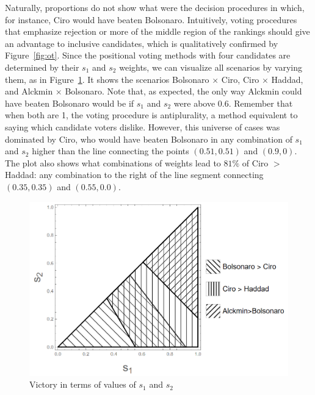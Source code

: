 \documentclass[hidelinks,11pt]{article} \usepackage[utf8]{inputenc}
\begin{document}


Naturally, proportions do not show what were the decision procedures in which,
for instance, Ciro would have beaten Bolsonaro. Intuitively, voting procedures
that emphasize rejection or more of the middle region of the rankings should
give an advantage to inclusive candidates, which is qualitatively confirmed by
Figure~\ref{fig:ot}. Since the positional voting methods with four candidates
are determined by their \(s_{1}\) and \(s_{2}\) weights, we can visualize all
scenarios by varying them, as in Figure~\ref{fig:positional4c}. It shows the
scenarios Bolsonaro \(\times\) Ciro, Ciro \(\times \) Haddad, and Alckmin
\(\times\) Bolsonaro. Note that, as expected, the only way Alckmin could have
beaten Bolsonaro would be if \(s_{1}\) and \(s_{2}\) were above 0.6. Remember
that when both are 1, the voting procedure is antiplurality, a method equivalent
to saying which candidate voters dislike. However, this universe of cases was
dominated by Ciro, who would have beaten Bolsonaro in any combination of
\(s_{1}\) and \(s_{2}\) higher than the line connecting the points
\((0.51,0.51)\) and \((0.9,0)\). The plot also shows what combinations of
weights lead to \(81\%\) of Ciro \(>\) Haddad: any combination to the right of
the line segment connecting \((0.35,0.35)\) and \((0.55,0.0)\).

\begin{figure}[!h] \centering \includegraphics[width=\columnwidth,
height=0.3\textheight]{./images/counterfactual_triangle.png}
\caption{Victory in terms of values of \(s_{1}\) and \(s_{2}\)}
 \label{fig:positional4c}
\end{figure}
\end{document}

